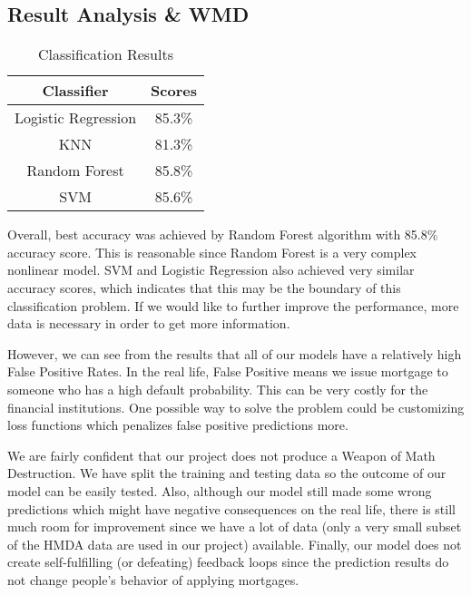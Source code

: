 \documentclass[letterpaper, 10 pt, conference]{ieeeconf}  %
\begin{document}
\subsection{Result Analysis \& WMD}
\begin{table}[h]
\centering
\caption{Classification Results}
\begin{tabular}{|c|c|}
\hline
Classifier & Scores \\\hline
Logistic Regression & 85.3\%\\\hline
KNN & 81.3\%\\\hline
Random Forest & 85.8\%\\\hline
SVM & 85.6\%\\\hline
\end{tabular}
\end{table}
Overall, best accuracy was achieved by Random Forest algorithm with 85.8\% accuracy score. This is reasonable since Random Forest is a very complex nonlinear model. SVM and Logistic Regression also achieved very similar accuracy scores, which indicates that this may be the boundary of this classification problem. If we would like to further improve the performance, more data is necessary in order to get more information.

However, we can see from the results that all of our models have a relatively high False Positive Rates. In the real life, False Positive means we issue mortgage to someone who has a high default probability. This can be very costly for the financial institutions. One possible way to solve the problem could be customizing loss functions which penalizes false positive predictions more.  

We are fairly confident that our project does not produce a Weapon of Math Destruction. We have split the training and testing data so the outcome of our model can be easily tested. Also, although our model still made some wrong predictions which might have negative consequences on the real life, there is still much room for improvement since we have a lot of data (only a very small subset of the HMDA data are used in our project) available. Finally, our model does not create self-fulfilling (or defeating) feedback loops since the prediction results do not change people's behavior of applying mortgages.
\end{document}
